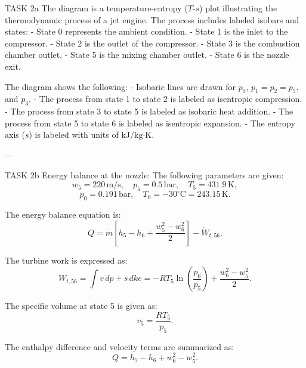 TASK 2a  
The diagram is a temperature-entropy (\( T \)-\( s \)) plot illustrating the thermodynamic process of a jet engine. The process includes labeled isobars and states:  
- State 0 represents the ambient condition.  
- State 1 is the inlet to the compressor.  
- State 2 is the outlet of the compressor.  
- State 3 is the combustion chamber outlet.  
- State 5 is the mixing chamber outlet.  
- State 6 is the nozzle exit.  

The diagram shows the following:  
- Isobaric lines are drawn for \( p_0 \), \( p_1 = p_2 = p_5 \), and \( p_3 \).  
- The process from state 1 to state 2 is labeled as isentropic compression.  
- The process from state 3 to state 5 is labeled as isobaric heat addition.  
- The process from state 5 to state 6 is labeled as isentropic expansion.  
- The entropy axis (\( s \)) is labeled with units of \( \text{kJ/kg·K} \).  

---

TASK 2b  
Energy balance at the nozzle:  
The following parameters are given:  
\[
w_5 = 220 \, \text{m/s}, \quad p_5 = 0.5 \, \text{bar}, \quad T_5 = 431.9 \, \text{K},  
\]
\[
p_0 = 0.191 \, \text{bar}, \quad T_0 = -30^\circ\text{C} = 243.15 \, \text{K}.
\]

The energy balance equation is:  
\[
Q = \dot{m} \left[ h_5 - h_6 + \frac{w_5^2 - w_6^2}{2} \right] - \dot{W}_{t,56}.
\]

The turbine work is expressed as:  
\[
W_{t,56} = \int v \, dp + s \, dke = -RT_5 \ln \left( \frac{p_6}{p_5} \right) + \frac{w_6^2 - w_5^2}{2}.
\]

The specific volume at state 5 is given as:  
\[
v_5 = \frac{RT_5}{p_5}.
\]

The enthalpy difference and velocity terms are summarized as:  
\[
Q = h_5 - h_6 + w_6^2 - w_5^2.
\]